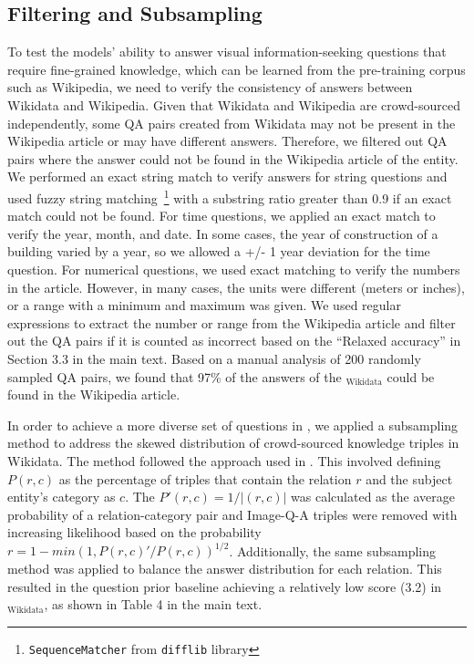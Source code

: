 \documentclass[11pt]{article}
\begin{document}
\subsection{Filtering and Subsampling}
\label{appendix:verify_sample}
To test the models' ability to answer visual information-seeking questions that require fine-grained knowledge, which can be learned from the pre-training corpus such as Wikipedia, we need to verify the consistency of answers between Wikidata and Wikipedia. Given that Wikidata and Wikipedia are crowd-sourced independently, some QA pairs created from Wikidata may not be present in the Wikipedia article or may have different answers. Therefore, we filtered out QA pairs where the answer could not be found in the Wikipedia article of the entity. We performed an exact string match to verify answers for string questions and used fuzzy string matching~\footnote{\texttt{SequenceMatcher} from \texttt{difflib} library} with a substring ratio greater than 0.9 if an exact match could not be found. For time questions, we applied an exact match to verify the year, month, and date. In some cases, the year of construction of a building varied by a year, so we allowed a +/- 1 year deviation for the time question. For numerical questions, we used exact matching to verify the numbers in the article. However, in many cases, the units were different (meters or inches), or a range with a minimum and maximum was given. 
We used regular expressions to extract the number or range from the Wikipedia article and filter out the QA pairs if it is counted as incorrect based on the ``Relaxed accuracy'' in Section 3.3 in the main text. 
Based on a manual analysis of 200 randomly sampled QA pairs, we found that 97\% of the answers of the \ourdataset$_\text{Wikidata}$ could be found in the Wikipedia article.

In order to achieve a more diverse set of questions in \ourdataset, we applied a subsampling method to address the skewed distribution of crowd-sourced knowledge triples in Wikidata. The method followed the approach used in \citet{zhong2022romqa}. This involved defining $P(r,c)$ as the percentage of triples that contain the relation $r$ and the subject entity's category as $c$. The $P'(r,c)=1/|(r,c)|$ was calculated as the average probability of a relation-category pair and Image-Q-A triples were removed with increasing likelihood based on the probability $r=1 - min(1, P(r,c)'/P(r,c))^{1/2}$. Additionally, the same subsampling method was applied to balance the answer distribution for each relation. This resulted in the question prior baseline achieving a relatively low score (3.2) in \ourdataset$_\text{Wikidata}$, as shown in Table 4 in the main text.
\end{document}
